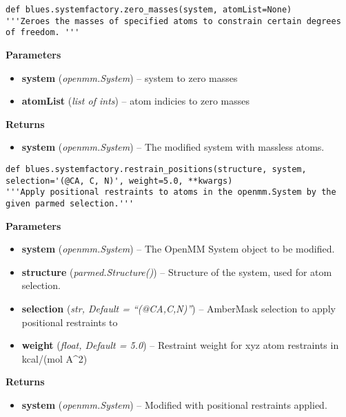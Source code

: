 \begin{description}
\begin{verbatim}
def blues.systemfactory.zero_masses(system, atomList=None)
'''Zeroes the masses of specified atoms to constrain certain degrees of freedom. '''
\end{verbatim}


\begin{description}
\item
    \textbf{Parameters}
\begin{itemize}
\item
  \textbf{system} (\emph{openmm.System}) -- system to zero masses
\item
  \textbf{atomList} (\emph{list of ints}) -- atom indicies to zero
  masses
\end{itemize}
\item
    \textbf{Returns}
\begin{itemize}
    \item 
        \textbf{system} (\emph{openmm.System}) -- The modified system with massless atoms.
\end{itemize}
\end{description}

\end{description}

\begin{description}
\begin{verbatim}
def blues.systemfactory.restrain_positions(structure, system, selection='(@CA, C, N)', weight=5.0, **kwargs)
'''Apply positional restraints to atoms in the openmm.System by the given parmed selection.'''
\end{verbatim}


\begin{description}
\item
    \textbf{Parameters}
\begin{itemize}
\item
  \textbf{system} (\emph{openmm.System}) -- The OpenMM System object to
  be modified.
\item
  \textbf{structure} (\emph{parmed.Structure()}) -- Structure of the
  system, used for atom selection.
\item
  \textbf{selection} (\emph{str, Default = ``(@CA,C,N)''}) -- AmberMask
  selection to apply positional restraints to
\item
  \textbf{weight} (\emph{float, Default = 5.0}) -- Restraint weight for
  xyz atom restraints in kcal/(mol A\^{}2)
\end{itemize}
\item
    \textbf{Returns}
\begin{itemize}
    \item
        \textbf{system} (\emph{openmm.System}) -- Modified with positional restraints applied.
\end{itemize}
\end{description}
\end{description}


